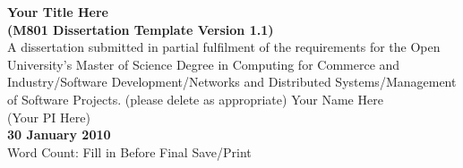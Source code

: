 
\begin{titlepage}
\begin{center}

{ \Large \bfseries Your Title Here\\(M801 Dissertation Template Version 1.1)}\\[4cm]
A dissertation submitted in partial fulfilment of the requirements for the Open University’s Master of Science Degree in Computing for Commerce and Industry/Software Development/Networks and Distributed Systems/Management of Software Projects.
(please delete as appropriate)
\vfill
Your Name Here\\
(Your PI Here)\\[.5cm]

\textbf{30 January 2010}\\[.5cm]

Word Count: Fill in Before Final Save/Print

\end{center}
\end{titlepage}
